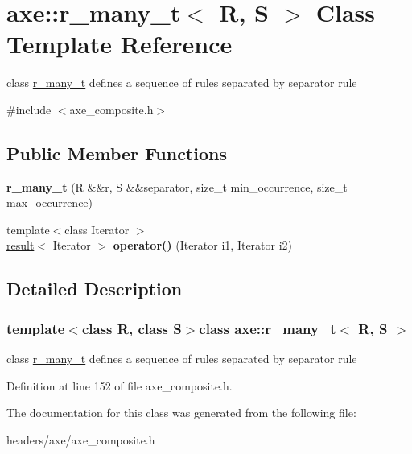 \hypertarget{classaxe_1_1r__many__t}{\section{axe\+:\+:r\+\_\+many\+\_\+t$<$ R, S $>$ Class Template Reference}
\label{classaxe_1_1r__many__t}
}


class \hyperlink{classaxe_1_1r__many__t}{r\+\_\+many\+\_\+t} defines a sequence of rules separated by separator rule  




{\ttfamily \#include $<$axe\+\_\+composite.\+h$>$}

\subsection*{Public Member Functions}
\begin{DoxyCompactItemize}
\item 
\hypertarget{classaxe_1_1r__many__t_aaa53ecf6a3b598ef1cd0489e2327509e}{{\bfseries r\+\_\+many\+\_\+t} (R \&\&r, S \&\&separator, size\+\_\+t min\+\_\+occurrence, size\+\_\+t max\+\_\+occurrence)}\label{classaxe_1_1r__many__t_aaa53ecf6a3b598ef1cd0489e2327509e}

\item 
\hypertarget{classaxe_1_1r__many__t_acf3cef4cf36bc1f0965f12e4079fbd6a}{{\footnotesize template$<$class Iterator $>$ }\\\hyperlink{structaxe_1_1result}{result}$<$ Iterator $>$ {\bfseries operator()} (Iterator i1, Iterator i2)}\label{classaxe_1_1r__many__t_acf3cef4cf36bc1f0965f12e4079fbd6a}

\end{DoxyCompactItemize}


\subsection{Detailed Description}
\subsubsection*{template$<$class R, class S$>$class axe\+::r\+\_\+many\+\_\+t$<$ R, S $>$}

class \hyperlink{classaxe_1_1r__many__t}{r\+\_\+many\+\_\+t} defines a sequence of rules separated by separator rule 

Definition at line 152 of file axe\+\_\+composite.\+h.



The documentation for this class was generated from the following file\+:\begin{DoxyCompactItemize}
\item 
headers/axe/axe\+\_\+composite.\+h\end{DoxyCompactItemize}
